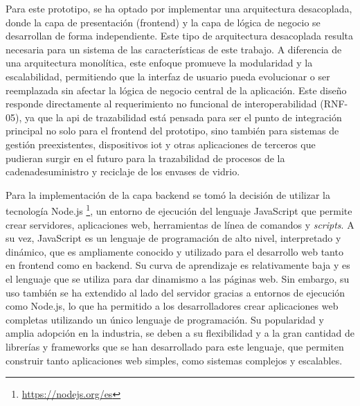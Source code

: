 Para este prototipo, se ha optado por implementar una arquitectura desacoplada, donde la capa de presentación (frontend) y la capa de lógica de negocio se desarrollan de forma independiente. Este tipo de arquitectura desacoplada resulta necesaria para un sistema de las características de este trabajo. A diferencia de una arquitectura monolítica, este enfoque promueve la modularidad y la escalabilidad, permitiendo que la interfaz de usuario pueda evolucionar o ser reemplazada sin afectar la lógica de negocio central de la aplicación. Este diseño responde directamente al requerimiento no funcional de interoperabilidad (RNF-05), ya que la \acrshort{api} de trazabilidad está pensada para ser el punto de integración principal no solo para el frontend del prototipo, sino también para sistemas de gestión preexistentes, dispositivos \acrshort{iot} y otras aplicaciones de terceros que pudieran surgir en el futuro para la \gls{trazabilidad} de procesos de la \gls{cadenadesuministro} y reciclaje de los envases de vidrio.

Para la implementación de la capa backend se tomó la decisión de utilizar la tecnología Node.js \footnote{\url{https://nodejs.org/es}}, un entorno de ejecución del lenguaje JavaScript que permite crear servidores, aplicaciones web, herramientas de línea de comandos y \textit{scripts}. A su vez, JavaScript es un lenguaje de programación de alto nivel, interpretado y dinámico, que es ampliamente conocido y utilizado para el desarrollo web tanto en frontend como en backend. Su curva de aprendizaje es relativamente baja y es el lenguaje que se utiliza para dar dinamismo a las páginas web. Sin embargo, su uso también se ha extendido al lado del servidor gracias a entornos de ejecución como Node.js, lo que ha permitido a los desarrolladores crear aplicaciones web completas utilizando un único lenguaje de programación. Su popularidad y amplia adopción en la industria, se deben a su flexibilidad y a la gran cantidad de librerías y frameworks que se han desarrollado para este lenguaje, que permiten construir tanto aplicaciones web simples, como sistemas complejos y escalables.

